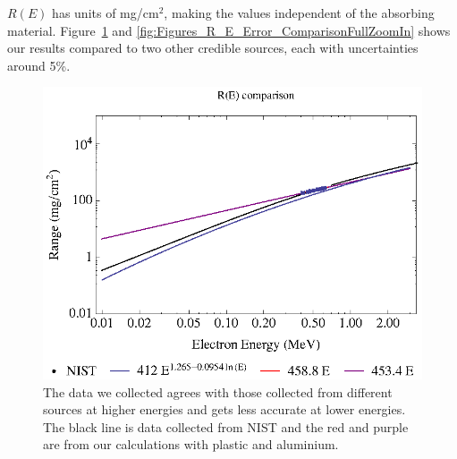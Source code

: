  $R(E)$ has units of mg/cm$^2$, making the values independent of the absorbing material. Figure~\ref{fig:Figures_R_E_Error_ComparisonFull} and \ref{fig:Figures_R_E_Error_ComparisonFullZoomIn} shows our results compared to two other credible sources\cite{RevModPhys.24.28,nistData}, each with uncertainties around 5\%.  

\begin{figure}[tbp]
	\centering
		\includegraphics[width=\textwidth]{Figures/R_E_Error_ComparisonFull.eps}
	\caption{The data we collected agrees with those collected from different sources at higher energies and gets less accurate at lower energies.  The black line is data collected from NIST and the red and purple are from our calculations with plastic and aluminium.}
	\label{fig:Figures_R_E_Error_ComparisonFull}
\end{figure}%
